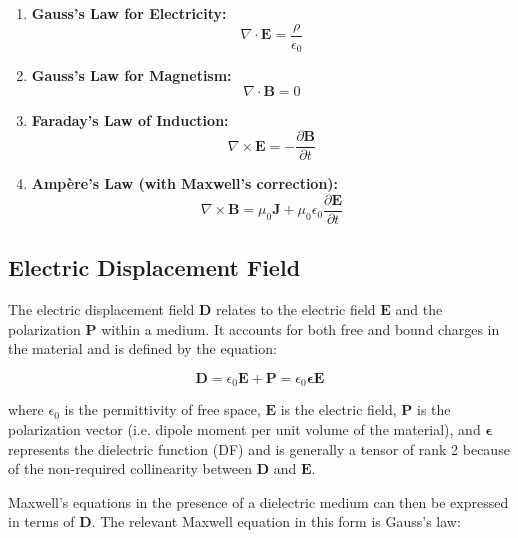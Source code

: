 \begin{enumerate}
    \item \textbf{Gauss's Law for Electricity:}
    \begin{equation}
    \nabla \cdot \mathbf{E} = \frac{\rho}{\epsilon_0}
    \end{equation}

    \item \textbf{Gauss's Law for Magnetism:}
    \begin{equation}
    \nabla \cdot \mathbf{B} = 0
    \end{equation}

    \item \textbf{Faraday's Law of Induction:}
    \begin{equation}
    \nabla \times \mathbf{E} = -\frac{\partial \mathbf{B}}{\partial t}
    \end{equation}

    \item \textbf{Ampère's Law (with Maxwell's correction):}
    \begin{equation}
    \nabla \times \mathbf{B} = \mu_0 \mathbf{J} + \mu_0 \epsilon_0 \frac{\partial \mathbf{E}}{\partial t}
    \end{equation}
\end{enumerate}

\subsection{Electric Displacement Field}


The electric displacement field \( \mathbf{D} \) relates to the electric field \( \mathbf{E} \) and the polarization \( \mathbf{P} \) within a medium. It accounts for both free and bound charges in the material and is defined by the equation:

\[
	\mathbf{D} = \epsilon_0 \mathbf{E} + \mathbf{P} = \epsilon_0 \boldsymbol{\epsilon} \mathbf{E}
\]

where \( \epsilon_0 \) is the permittivity of free space, \( \mathbf{E} \) is the electric field, \( \mathbf{P} \) is the polarization vector (i.e. dipole moment per unit volume of the material), and \( \boldsymbol{\epsilon} \) represents the dielectric function (DF) %
and is generally a tensor of rank 2 because of the non-required collinearity between \( \mathbf{D} \) and \( \mathbf{E} \). %

Maxwell's equations in the presence of a dielectric medium can then be expressed in terms of \( \mathbf{D} \). The relevant Maxwell equation in this form is Gauss's law:

